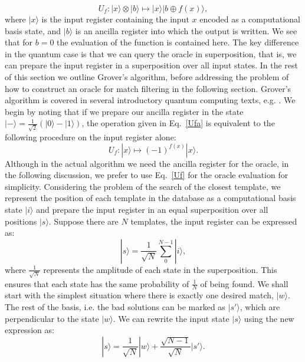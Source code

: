 \documentclass[aps,prd,nofootinbib,twocolumn,reprint,superscriptaddress,showpacs,showkeys,longbibliography]{revtex4-1}
\newcommand{\ket}[1]{|#1\rangle}
\begin{document}
\begin{equation}
    \label{Ufa}
    U_f: \ket{x}\otimes\ket{b}\longmapsto\ket{x}\ket{b \oplus f(x)},
\end{equation}
where $\ket{x}$ is the input register containing the input $x$ encoded as a computational basis state, and $\ket{b}$ is an ancilla register into which the output is written. We see that for $b=0$ the evaluation of the function is contained here. The key difference in the quantum case is that we can query the oracle in superposition, that is, we can prepare the input register in a superposition over all input states. In the rest of this section we outline Grover's algorithm, before addressing the problem of how to construct an oracle for match filtering in the following section. Grover's algorithm is covered in several introductory quantum computing texts, e.g. \cite{barnett2009quantum, nielsen2002quantum,kaye2007introduction}. We begin by noting that if we prepare our ancilla register in the state $\ket{-}=\frac{1}{\sqrt{2}}(\ket{0}-\ket{1})$, the operation given in Eq.~\ref{Ufa} is equivalent to the following procedure on the input register alone:
\begin{equation}
    \label{Uf}
    U_f: \ket{x}\longmapsto(-1)^{f(x)}\ket{x}.
\end{equation}
Although in the actual algorithm we need the ancilla register for the oracle, in the following discussion, we prefer to use Eq.~\ref{Uf} for the oracle evaluation for simplicity. 
\newline\newline Considering the problem of the search of the closest template, we represent the position of each template in the database as a computational basis state $\ket{i}$ and prepare the input register in an equal superposition over all positions $\ket{s}$. Suppose there are $N$ templates, the input register can be expressed as:
\begin{equation}
    \label{soo}
    \ket{s}=\frac{1}{\sqrt{N}}\sum^{N-1}_{0} \ket{i},
\end{equation}
where $\frac{1}{\sqrt{N}}$ represents the amplitude of each state in the superposition. This ensures that each state has the same probability of $\frac{1}{N}$ of being found. We shall start with the simplest situation where there is exactly one desired match, $\ket{w}$. The rest of the basis, i.e. the bad solutions can be marked as $\ket{s'}$, which are perpendicular to the state $\ket{w}$. We can rewrite the input state $\ket{s}$ using the new expression as:
\begin{equation}
    \label{so}
    \ket{s}=\frac{1}{\sqrt{N}}\ket{w}+\frac{\sqrt{N-1}}{\sqrt{N}}\ket{s'}.
\end{equation}
\end{document}
